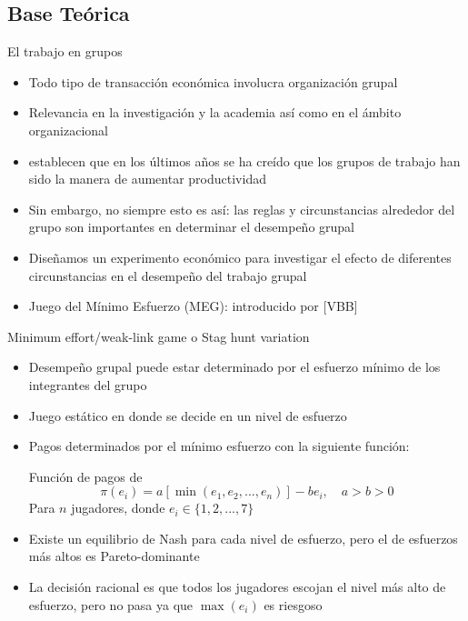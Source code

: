 \documentclass[t,9pt,xcolor=dvipsnames]{beamer}
\begin{document}
\subsection{Base Teórica}
\begin{frame}{El trabajo en grupos}
    \begin{itemize}
        \item Todo tipo de transacción económica involucra organización grupal
        \item Relevancia en la investigación y la academia así como en el ámbito organizacional
        \item \textcite{Nalbantian.1997} establecen que en los últimos años se ha creído que los grupos de trabajo han sido la manera de aumentar productividad
        \item Sin embargo, no siempre esto es así: las reglas y circunstancias alrededor del grupo son importantes en determinar el desempeño grupal
        \item Diseñamos un experimento económico para investigar el efecto de diferentes circunstancias en el desempeño del trabajo grupal
        \item Juego del Mínimo Esfuerzo (MEG): introducido por \Textcite{vanHuyck.1990} [VBB]
        \end{itemize}
\end{frame}
\begin{frame}{Minimum effort/weak-link game o Stag hunt variation}
\begin{itemize}
        \item Desempeño grupal puede estar determinado por el esfuerzo mínimo de los integrantes del grupo
    \item Juego estático en donde se decide en un nivel de esfuerzo
    \item Pagos determinados por el mínimo esfuerzo con la siguiente función:
    \begin{block}{Función de pagos de \textcite{vanHuyck.1990}}
    $$\pi(e_i)=a \left[\min(e_1, e_2,..., e_n) \right]-b e_i, \quad a>b>0$$
    Para $n$ jugadores, donde $e_i \in \{ 1,2,...,7\}$
    \end{block}
    \item Existe un equilibrio de Nash para cada nivel de esfuerzo, pero el de esfuerzos más altos es Pareto-dominante
    \item La decisión racional es que todos los jugadores escojan el nivel más alto de esfuerzo, pero no pasa ya que $\max(e_i)$ es riesgoso
\end{itemize}
\end{frame}
\end{document}
